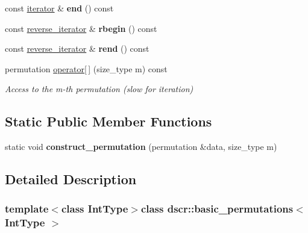\begin{DoxyCompactItemize}
\item 
\hypertarget{classdscr_1_1basic__permutations_a8a376fa280a8bbfadc686bafe13af06e}{const \hyperlink{classdscr_1_1basic__permutations_1_1iterator}{iterator} \& {\bfseries end} () const }\label{classdscr_1_1basic__permutations_a8a376fa280a8bbfadc686bafe13af06e}

\item 
\hypertarget{classdscr_1_1basic__permutations_a6f15148494c5246a6252462a1b6c618b}{const \hyperlink{classdscr_1_1basic__permutations_1_1reverse__iterator}{reverse\-\_\-iterator} \& {\bfseries rbegin} () const }\label{classdscr_1_1basic__permutations_a6f15148494c5246a6252462a1b6c618b}

\item 
\hypertarget{classdscr_1_1basic__permutations_a6dbc50bc7416d7f9b317cd9f2d64335e}{const \hyperlink{classdscr_1_1basic__permutations_1_1reverse__iterator}{reverse\-\_\-iterator} \& {\bfseries rend} () const }\label{classdscr_1_1basic__permutations_a6dbc50bc7416d7f9b317cd9f2d64335e}

\item 
permutation \hyperlink{classdscr_1_1basic__permutations_a2167e2de096866868c0b539f01ad4d79}{operator\mbox{[}$\,$\mbox{]}} (size\-\_\-type m) const 
\begin{DoxyCompactList}\small\item\em Access to the m-\/th permutation (slow for iteration) \end{DoxyCompactList}\end{DoxyCompactItemize}
\subsection*{Static Public Member Functions}
\begin{DoxyCompactItemize}
\item 
\hypertarget{classdscr_1_1basic__permutations_a988cde34f39cc9e935882d211551f315}{static void {\bfseries construct\-\_\-permutation} (permutation \&data, size\-\_\-type m)}\label{classdscr_1_1basic__permutations_a988cde34f39cc9e935882d211551f315}

\end{DoxyCompactItemize}


\subsection{Detailed Description}
\subsubsection*{template$<$class Int\-Type$>$class dscr\-::basic\-\_\-permutations$<$ Int\-Type $>$}

